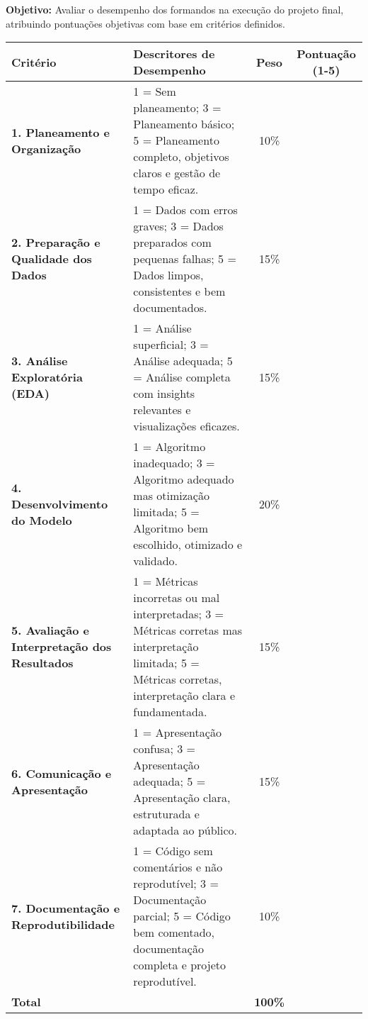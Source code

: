 \documentclass[12pt]{article}
\begin{document}
\textbf{Objetivo:} Avaliar o desempenho dos formandos na execução do projeto final, atribuindo pontuações objetivas com base em critérios definidos.

\begin{center}
\renewcommand{\arraystretch}{1.5}
\begin{tabular}{p{4cm} p{6.5cm} c c}
\toprule
\textbf{Critério} & \textbf{Descritores de Desempenho} & \textbf{Peso} & \textbf{Pontuação (1-5)} \\
\midrule

\textbf{1. Planeamento e Organização} &
1 = Sem planeamento; 3 = Planeamento básico; 5 = Planeamento completo, objetivos claros e gestão de tempo eficaz. & 10\% & \\

\textbf{2. Preparação e Qualidade dos Dados} &
1 = Dados com erros graves; 3 = Dados preparados com pequenas falhas; 5 = Dados limpos, consistentes e bem documentados. & 15\% & \\

\textbf{3. Análise Exploratória (EDA)} &
1 = Análise superficial; 3 = Análise adequada; 5 = Análise completa com insights relevantes e visualizações eficazes. & 15\% & \\

\textbf{4. Desenvolvimento do Modelo} &
1 = Algoritmo inadequado; 3 = Algoritmo adequado mas otimização limitada; 5 = Algoritmo bem escolhido, otimizado e validado. & 20\% & \\

\textbf{5. Avaliação e Interpretação dos Resultados} &
1 = Métricas incorretas ou mal interpretadas; 3 = Métricas corretas mas interpretação limitada; 5 = Métricas corretas, interpretação clara e fundamentada. & 15\% & \\

\textbf{6. Comunicação e Apresentação} &
1 = Apresentação confusa; 3 = Apresentação adequada; 5 = Apresentação clara, estruturada e adaptada ao público. & 15\% & \\

\textbf{7. Documentação e Reprodutibilidade} &
1 = Código sem comentários e não reprodutível; 3 = Documentação parcial; 5 = Código bem comentado, documentação completa e projeto reprodutível. & 10\% & \\

\midrule
\textbf{Total} & & \textbf{100\%} & \\
\bottomrule
\end{tabular}
\end{center}
\end{document}
